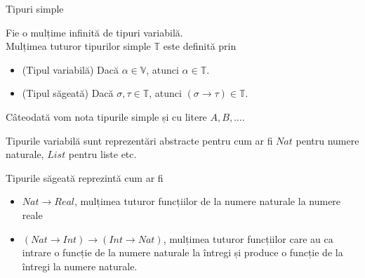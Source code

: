 \documentclass[xcolor=pdftex,romanian,colorlinks]{beamer}
\begin{document}
\begin{frame}{Tipuri simple}

Fie  o mulțime infinită de \alert{tipuri variabilă}. \\
Mulțimea tuturor \alert{tipurilor simple} $\mathbb{T}$ este definită prin
\vspace{-.3cm}
\begin{center}
\end{center}
\vspace{-.5cm}
\begin{itemize}
	\item \alert{(Tipul variabilă)} Dacă $\alpha \in \mathbb{V}$, atunci $\alpha \in \mathbb{T}$.
	\item \alert{(Tipul săgeată)} Dacă $\sigma,\tau \in \mathbb{T}$, atunci  $(\sigma \rightarrow \tau) \in \mathbb{T}$.
\end{itemize}
\vspace{-.2cm}
Câteodată vom nota tipurile simple și cu litere $A,B,\ldots$.


\smallskip
Tipurile variabilă sunt reprezentări abstracte pentru  cum ar fi $Nat$ pentru numere naturale, $List$ pentru liste etc. 

\smallskip
Tipurile săgeată reprezintă   cum ar fi 
\vspace{-.2cm}
\begin{itemize}
	\item $Nat \to Real$, mulțimea tuturor funcțiilor de la numere naturale la numere reale
	\item $(Nat \to Int) \to (Int \to Nat)$, mulțimea tuturor funcțiilor care au ca intrare o funcție de la numere naturale la întregi și produce o funcție de la întregi la numere naturale.
\end{itemize}
\end{frame}
\end{document}
